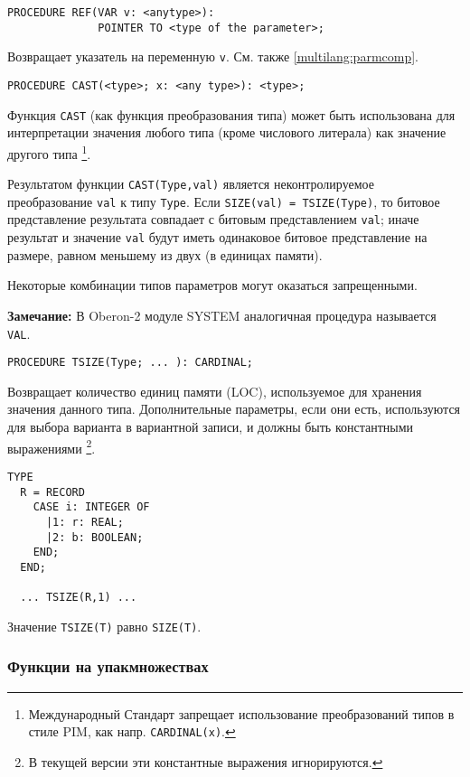 \begin{verbatim}
PROCEDURE REF(VAR v: <anytype>):
              POINTER TO <type of the parameter>;
\end{verbatim}


Возвращает указатель на переменную {\tt v}. См. также \ref{multilang:parmcomp}.

\begin{verbatim}
PROCEDURE CAST(<type>; x: <any type>): <type>;
\end{verbatim}

Функция {\tt CAST} (как функция преобразования типа)
может быть использована для интерпретации значения любого типа
(кроме числового литерала) как значение другого типа
\footnote{Международный Стандарт запрещает использование
преобразований типов в стиле PIM, как напр.
{\tt CARDINAL(x)}.}.

Результатом функции {\tt  CAST(Type,val)} является неконтролируемое
преобразование {\tt val} к типу {\tt Type}.
Если {\tt SIZE(val) = TSIZE(Type)}, то
битовое представление результата совпадает с битовым представлением
{\tt  val};
иначе результат и значение {\tt val}
будут иметь одинаковое битовое представление на размере, равном 
меньшему из двух (в единицах памяти).

Некоторые комбинации типов параметров могут оказаться запрещенными.

{\bf Замечание:} В Oberon-2 модуле SYSTEM аналогичная процедура
называется \verb'VAL'.

\begin{verbatim}
PROCEDURE TSIZE(Type; ... ): CARDINAL;
\end{verbatim}
Возвращает количество единиц памяти (LOC), используемое для
хранения значения данного типа. Дополнительные параметры, если
они есть, используются для выбора варианта в вариантной записи,
и должны быть константными выражениями
\footnote{В текущей версии эти константные выражения игнорируются.}.

\Example
\begin{verbatim}
TYPE
  R = RECORD
    CASE i: INTEGER OF
      |1: r: REAL;
      |2: b: BOOLEAN;
    END;
  END;

  ... TSIZE(R,1) ...

\end{verbatim}

Значение {\tt TSIZE(T)} равно {\tt SIZE(T)}.

\subsubsection{Функции на упакмножествах}

